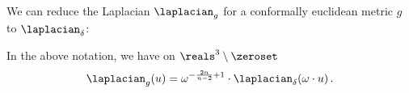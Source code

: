 \documentclass[titlepage,numbers=noenddot,oneside,%
cleardoublepage=empty,paper=a4,fontsize=11pt,%
english,%
]{scrartcl}
\newcommand*{\mathfullstop}{\,.}
\begin{document}
We can reduce the Laplacian \( \laplacian_g \) for a conformally euclidean metric \( g \) to \( \laplacian_{\delta} \):
\begin{lemma}\label{lem:laplacian_on_schwarzschild}
    In the above notation, we have on \( \reals^3\setminus \zeroset \)
    \begin{equation*}
        \laplacian_g(u)=\omega^{-\frac{2n}{n-2}+1}\cdot \laplacian_\delta(\omega \cdot u)\mathfullstop
    \end{equation*}
\end{lemma}
\end{document}
